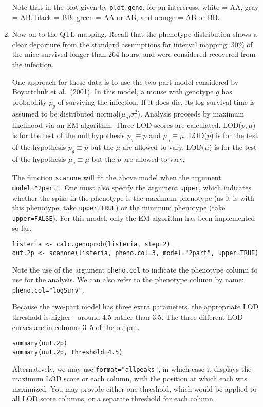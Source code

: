 \documentclass[10pt,letterpaper]{article}
\newcommand{\usercolor}{\color [named]{BlueViolet}}
\begin{document}
\begin{enumerate}
Note that in the plot given by \verb-plot.geno-, for an intercross,
white = AA, gray = AB, black = BB, green = AA or AB, and orange = AB
or BB.

\item Now on to the QTL mapping.  Recall that the phenotype
distribution shows a clear departure from the standard assumptions for
interval mapping; 30\% of the mice survived longer than 264 hours, and
were considered recovered from the infection.

One approach for these data is to use the two-part model considered by
Boyartchuk et al.\ (2001).  In this model, a mouse with genotype $g$
has probability $p_g$ of surviving the infection.  If it does die, its
log survival time is assumed to be distributed
normal($\mu_g$,$\sigma^2$).  Analysis proceeds by maximum likelihood
via an EM algorithm.  Three LOD scores are calculated.  LOD($p,\mu$)
is for the test of the null hypothesis $p_g \equiv p$ and $\mu_g
\equiv \mu$.  LOD($p$) is for the test of the hypothesis $p_g \equiv
p$ but the $\mu$ are allowed to vary.  LOD($\mu$) is for the test of
the hypothesis $\mu_g \equiv \mu$ but the $p$ are allowed to vary.

The function \verb-scanone- will fit the above model when the argument
\verb-model="2part"-.  One must also specify the argument
\verb-upper-, which indicates whether the spike in the phenotype is
the maximum phenotype (as it is with this phenotype; take
\verb-upper=TRUE-) or the minimum phenotype (take \verb-upper=FALSE-).
For this model, only the EM algorithm has been implemented so far.

\usercolor
\verb|listeria <- calc.genoprob(listeria, step=2)| \\
\verb|out.2p <- scanone(listeria, pheno.col=3, model="2part", upper=TRUE)|
\normalcolor

Note the use of the argument \verb-pheno.col- to indicate the
phenotype column to use for the analysis.  We can also refer to the
phenotype column by name: \verb-pheno.col="logSurv"-.

Because the two-part model has three extra parameters, the
appropriate LOD threshold is higher---around 4.5 rather than 3.5.  The
three different LOD curves are in columns 3--5 of the output.  

\usercolor
\verb|summary(out.2p)| \\
\verb|summary(out.2p, threshold=4.5)| 
\normalcolor

Alternatively, we may use \verb-format="allpeaks"-, in which case it
displays the maximum LOD score or each column, with the position at
which each was maximized.  You may provide either one threshold, which
would be applied to all LOD score columns, or a separate threshold for
each column.


\end{enumerate}
\end{document}
